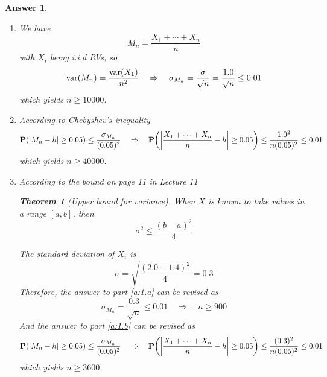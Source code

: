 \documentclass[utf8]{article}
\theoremstyle{definition}%
\theoremstyle{plain}%
\newtheorem{answer}{Answer} %
\newtheorem{theorem}{Theorem} %
\begin{document}
\begin{answer} ~
    \begin{enumerate}[label=(\alph*)]
        \item \label{a:1.a} We have
        \begin{equation}
            M_n = \frac{X_1 + \cdots + X_n}{n}
        \end{equation}
        with $X_i$ being i.i.d RVs, so
        \begin{equation}
            \mathrm{var}(M_n) = \frac{\mathrm{var}(X_1)}{n^2} \quad\Rightarrow\quad \sigma_{M_n} = \frac{\sigma}{\sqrt{n}} = \frac{1.0}{\sqrt{n}} \leq 0.01
        \end{equation}
        which yields $n \geq 10000$.
        \item \label{a:1.b} According to Chebyshev's inequality
        \begin{equation}
            \mathbf{P}(\abs{M_n - h} \geq 0.05) \leq \frac{\sigma_{M_n}}{(0.05)^2} \quad\Rightarrow\quad \mathbf{P}\qty(\abs{\frac{X_1 + \cdots + X_n}{n} - h} \geq 0.05) \leq \frac{1.0^2}{n(0.05)^2} \leq 0.01
        \end{equation}
        which yields $n \geq 40000$.
        \item According to the bound on page 11 in Lecture 11
        \begin{theorem}[Upper bound for variance]
            When $X$ is known to take values in a range $[a, b]$, then
            \begin{equation}
                \sigma^2 \leq \frac{(b - a)^2}{4}
            \end{equation}
        \end{theorem}
        The standard deviation of $X_i$ is
        \begin{equation}
            \sigma = \sqrt{\frac{(2.0 - 1.4)^2}{4}} = 0.3
        \end{equation}
        Therefore, the answer to part \ref{a:1.a} can be revised as
        \begin{equation}
            \sigma_{M_n} = \frac{0.3}{\sqrt{n}} \leq 0.01 \quad\Rightarrow\quad n \geq 900
        \end{equation}
        And the answer to part \ref{a:1.b} can be revised as
        \begin{equation}
            \mathbf{P}(\abs{M_n - h} \geq 0.05) \leq \frac{\sigma_{M_n}}{(0.05)^2} \quad\Rightarrow\quad \mathbf{P}\qty(\abs{\frac{X_1 + \cdots + X_n}{n} - h} \geq 0.05) \leq \frac{(0.3)^2}{n(0.05)^2} \leq 0.01
        \end{equation}
        which yields $n \geq 3600$.
    \end{enumerate}
\end{answer}
\end{document}
